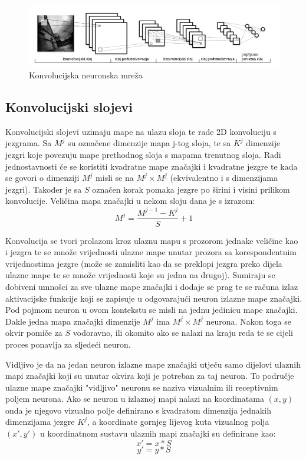 \documentclass[times, utf8, zavrsni, numeric]{fer}
\begin{document}
\begin{figure}
    \centering
    \includegraphics[width=14cm]{img/konvolucijska-mreza.png}
    \caption{Konvolucijska neuronska mreža}
    \label{fig:konvolucijska-mreza}
\end{figure}

\subsection{Konvolucijski slojevi}
Konvolucijski slojevi uzimaju mape na ulazu sloja te rade 2D konvoluciju s jezgrama. Sa $M^j$ su označene dimenzije mapa j-tog sloja, te sa $K^j$ dimenzije jezgri koje povezuju mape prethodnog sloja s mapama trenutnog sloja. Radi jednostavnosti će se koristiti kvadratne mape značajki i kvadratne jezgre te kada se govori o dimenziji $M^j$ misli se na $M^j \times M^j$ (ekvivalentno i s dimenzijama jezgri). Također je sa $S$ označen korak pomaka jezgre po širini i visini prilikom konvolucije. Veličina mapa značajki u nekom sloju dana je s izrazom:
\begin{equation}
M^j = \frac{M^{j-1} - K^j}{S} + 1
\end{equation}

Konvolucija se tvori prolazom kroz ulaznu mapu s prozorom jednake veličine kao i jezgra te se množe vrijednosti ulazne mape unutar prozora sa korespondentnim vrijednostima jezgre (može se zamisliti kao da se preklopi jezgra preko dijela ulazne mape te se množe vrijednosti koje su jedna na drugoj). Sumiraju se dobiveni umnošci za sve ulazne mape značajki i dodaje se prag te se računa izlaz aktivacijske funkcije koji se zapisuje u odgovarajući neuron izlazne mape značajki. Pod pojmom neuron u ovom kontekstu se misli na jednu jedinicu mape značajki. Dakle jedna mapa značajki dimenzije $M^j$ ima $M^j \times M^j$ neurona. Nakon toga se okvir pomiče za $S$ vodoravno, ili okomito ako se nalazi na kraju reda te se cijeli proces ponavlja za sljedeći neuron.

Vidljivo je da na jedan neuron izlazne mape značajki utječu samo dijelovi ulaznih mapi značajki koji su unutar okvira koji je potreban za taj neuron. To područje ulazne mape značajki "vidljivo" neuronu se naziva vizualnim ili receptivnim poljem neurona. Ako se neuron u izlaznoj mapi nalazi na koordinatama $(x, y)$ onda je njegovo vizualno polje definirano s kvadratom dimenzija jednakih dimenzijama jezgre $K^j$, a koordinate gornjeg lijevog kuta vizualnog polja $(x', y')$ u koordinatnom sustavu ulaznih mapi značajki su definirane kao:
\begin{equation}
x' = x*S
\end{equation}
\begin{equation}
y' = y*S
\end{equation}
\end{document}
